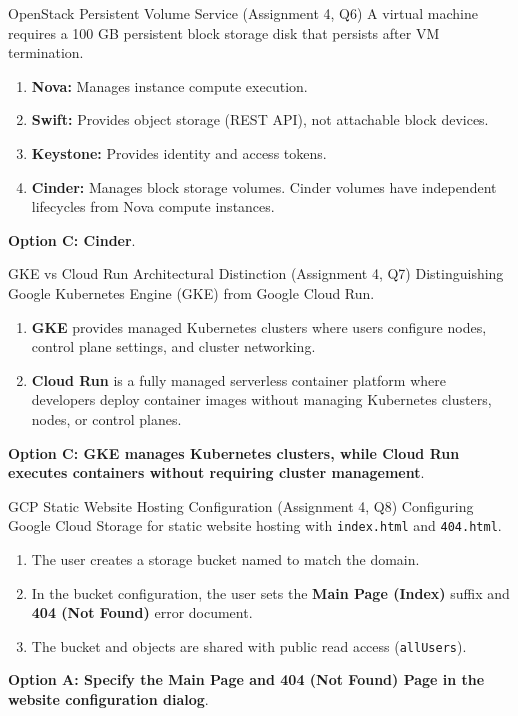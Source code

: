 \begin{solved}{OpenStack Persistent Volume Service (Assignment 4, Q6)}
\Given A virtual machine requires a 100 GB persistent block storage disk that persists after VM termination.
\Steps
\begin{enumerate}[leftmargin=*]
  \item \textbf{Nova:} Manages instance compute execution.
  \item \textbf{Swift:} Provides object storage (REST API), not attachable block devices.
  \item \textbf{Keystone:} Provides identity and access tokens.
  \item \textbf{Cinder:} Manages block storage volumes. Cinder volumes have independent lifecycles from Nova compute instances.
\end{enumerate}
\Answer \textbf{Option C: Cinder}.
\end{solved}

\begin{solved}{GKE vs Cloud Run Architectural Distinction (Assignment 4, Q7)}
\Given Distinguishing Google Kubernetes Engine (GKE) from Google Cloud Run.
\Steps
\begin{enumerate}[leftmargin=*]
  \item \textbf{GKE} provides managed Kubernetes clusters where users configure nodes, control plane settings, and cluster networking.
  \item \textbf{Cloud Run} is a fully managed serverless container platform where developers deploy container images without managing Kubernetes clusters, nodes, or control planes.
\end{enumerate}
\Answer \textbf{Option C: GKE manages Kubernetes clusters, while Cloud Run executes containers without requiring cluster management}.
\end{solved}

\begin{solved}{GCP Static Website Hosting Configuration (Assignment 4, Q8)}
\Given Configuring Google Cloud Storage for static website hosting with \texttt{index.html} and \texttt{404.html}.
\Steps
\begin{enumerate}[leftmargin=*]
  \item The user creates a storage bucket named to match the domain.
  \item In the bucket configuration, the user sets the \textbf{Main Page (Index)} suffix and \textbf{404 (Not Found)} error document.
  \item The bucket and objects are shared with public read access (\texttt{allUsers}).
\end{enumerate}
\Answer \textbf{Option A: Specify the Main Page and 404 (Not Found) Page in the website configuration dialog}.
\end{solved}


